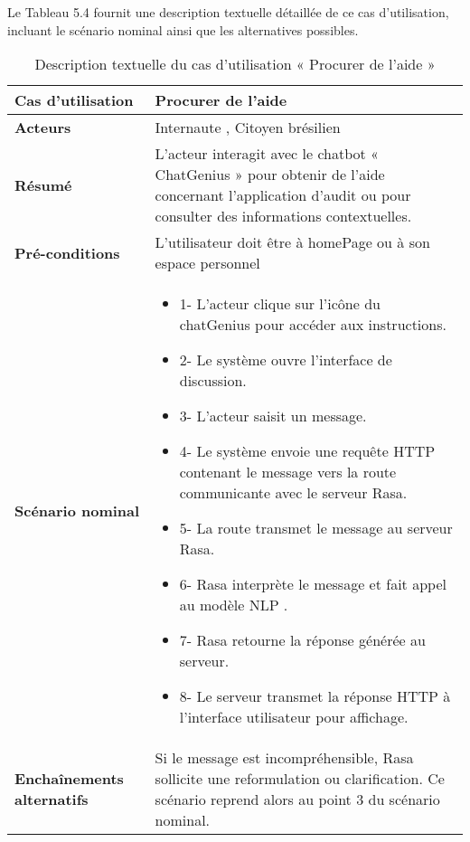 Le Tableau 5.4 fournit une description textuelle détaillée de ce cas d’utilisation, incluant le scénario nominal ainsi que les alternatives possibles.

\begin{longtable}{|>{\arraybackslash}p{4.2cm}|>{\arraybackslash}p{12.5cm}|}
\caption{\centering Description textuelle du cas d'utilisation « Procurer de l’aide »}
\label{tab:backlog} \\
\hline
\rowcolor{gray!30}
\textbf{Cas d'utilisation} & Procurer de l’aide \\
\hline
\endfirsthead

\hline
\endhead

\hline
\endfoot

\hline \hline
\endlastfoot

\textbf{Acteurs}  &Internaute , Citoyen brésilien \\
\hline
\textbf{Résumé} &
L’acteur interagit avec le chatbot « ChatGenius » pour obtenir de l’aide concernant l’application d’audit ou pour consulter des informations contextuelles. \\
\hline
\textbf{Pré-conditions} &
L’utilisateur doit être à homePage ou à son espace personnel \\
\hline
\textbf{Scénario nominal}  &
\begin{itemize}[label=]
 \item{1-} L’acteur clique sur l’icône du chatGenius pour accéder aux instructions.
 \item{2-} Le système ouvre l’interface de discussion.
 \item{3-} L’acteur saisit un message.
 \item{4-} Le système envoie une requête HTTP contenant le message vers la route communicante avec le serveur Rasa.
 \item{5-} La route transmet le message au serveur Rasa.
 \item{6-} Rasa interprète le message et fait appel au modèle NLP .
 \item{7-} Rasa retourne la réponse générée au serveur.
 \item{8-} Le serveur transmet la réponse HTTP à l’interface utilisateur pour affichage.
\end{itemize} \\
\hline
\textbf{Enchaînements alternatifs} &
Si le message est incompréhensible, Rasa sollicite une reformulation ou clarification. Ce scénario reprend alors au point 3 du scénario nominal. \\
\hline

\end{longtable}


